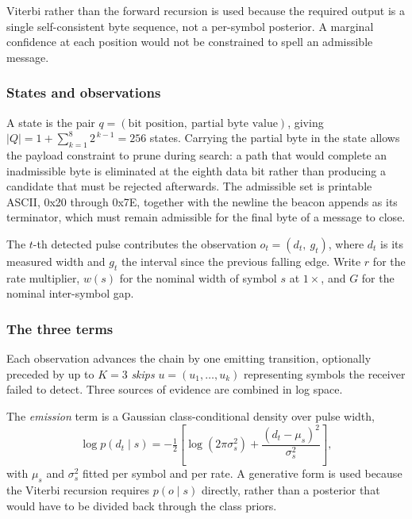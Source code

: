 Viterbi rather than the forward recursion is used because the required output
is a single self-consistent byte sequence, not a per-symbol posterior. A
marginal confidence at each position would not be constrained to spell an
admissible message.

\subsubsection{States and observations}

A state is the pair $q=(\text{bit position},\ \text{partial byte value})$,
giving $|Q| = 1 + \sum_{k=1}^{8} 2^{\,k-1} = 256$ states. Carrying the partial
byte in the state allows the payload constraint to prune during search: a path
that would complete an inadmissible byte is eliminated at the eighth data bit
rather than producing a candidate that must be rejected afterwards. The
admissible set is printable ASCII, 0x20 through 0x7E, together with the newline
the beacon appends as its terminator, which must remain admissible for the
final byte of a message to close.

The $t$-th detected pulse contributes the observation $o_t = (d_t,\ g_t)$,
where $d_t$ is its measured width and $g_t$ the interval since the previous
falling edge. Write $r$ for the rate multiplier, $w(s)$ for the nominal width
of symbol $s$ at $1\times$, and $G$ for the nominal inter-symbol gap.

\subsubsection{The three terms}

Each observation advances the chain by one emitting transition, optionally
preceded by up to $K=3$ \emph{skips} $u = (u_1,\dots,u_k)$ representing symbols
the receiver failed to detect. Three sources of evidence are combined in log
space.

The \emph{emission} term is a Gaussian class-conditional density over pulse
width,
\begin{equation}
\log p(d_t \mid s) = -\tfrac{1}{2}\left[\log\!\left(2\pi\sigma_s^2\right)
  + \frac{\left(d_t - \mu_s\right)^2}{\sigma_s^2}\right],
\label{eq:emission}
\end{equation}
with $\mu_s$ and $\sigma_s^2$ fitted per symbol and per rate. A generative form
is used because the Viterbi recursion requires $p(o \mid s)$ directly, rather
than a posterior that would have to be divided back through the class priors.

